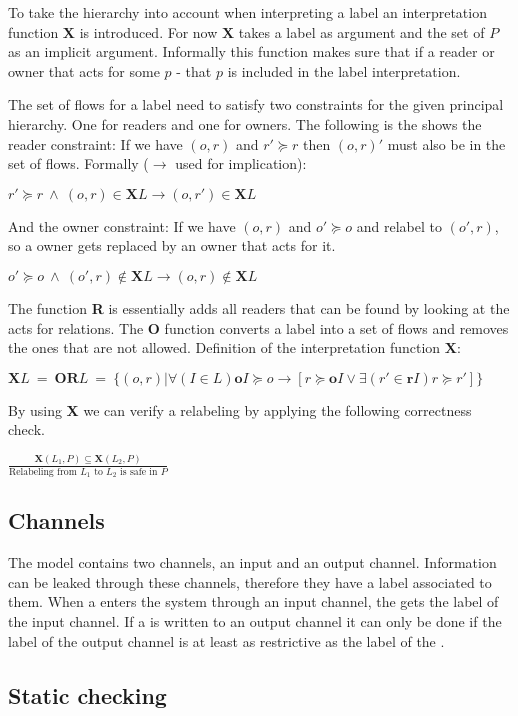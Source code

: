 To take the \principal{} hierarchy into account when interpreting a label an interpretation function $\textbf{X}$ is introduced.
For now $\textbf{X}$ takes a label as argument and the set of \principals{} $P$ as an implicit argument.
Informally this function makes sure that if a reader or owner that acts for some \principal{} $p$ - that $p$ is included in the label interpretation.

The set of flows for a label need to satisfy two constraints for the given principal hierarchy.
One for readers and one for owners.
The following is the shows the reader constraint:
If we have $(o,r)$ and $r' \succeq r$ then $(o,r)'$ must also be in the set of flows.
Formally ($\rightarrow$ used for implication):
\begin{center}
  $r' \succeq r \ \wedge \ (o,r) \in \textbf{X}L \rightarrow (o,r') \in \textbf{X}L$
\end{center}
And the owner constraint:
If we have $(o,r)$ and $o' \succeq o$ and relabel to $(o',r)$, so a owner gets replaced by an owner that acts for it.
\begin{center}
  $o' \succeq o \ \wedge \ (o',r) \notin \textbf{X}L \rightarrow (o,r) \notin \textbf{X}L$
\end{center}

The function \textbf{R} is essentially adds all readers that can be found by looking at the acts for relations.
The \textbf{O} function converts a label into a set of flows and removes the ones that are not allowed.
Definition of the interpretation function $\textbf{X}$:
\begin{definition}
  $\textbf{X}L \ = \ \textbf{OR}L \ = \ \{(o,r)|\forall (I \in L) \textbf{o}I \succeq o \rightarrow [r \succeq \textbf{o}I \vee \exists (r' \in \textbf{r}I) r \succeq r'] \}$
\end{definition}

By using \textbf{X} we can verify a relabeling by applying the following correctness check.
\begin{definition}
  $\frac{\textbf{X}(L_1, P)\subseteq \textbf{X}(L_2,P)}{\text{Relabeling from } L_1 \text{ to } L_2 \text{ is safe in } P }$
\end{definition}

\subsection{Channels}
The model contains two channels, an input and an output channel.
Information can be leaked through these channels, therefore they have a label associated to them.
When a \xvalue{} enters the system through an input channel, the \xvalue{} gets the label of the input channel.
If a \xvalue{} is written to an output channel it can only be done if the label of the output channel is at least as restrictive as the label of the \xvalue{}.

\subsection{Static checking}
